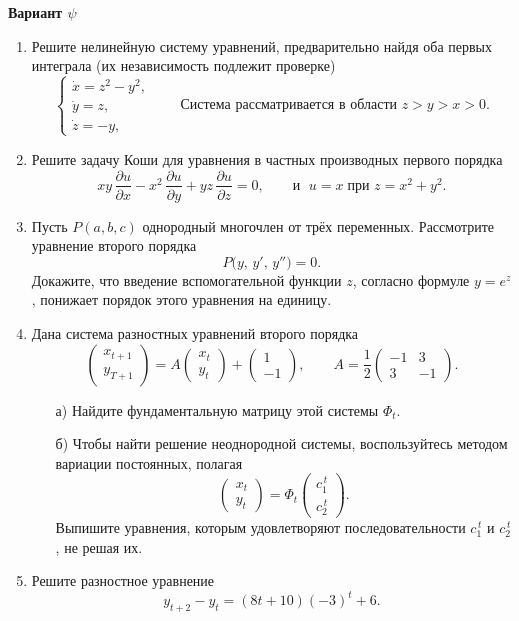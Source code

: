 \documentclass[12pt]{article}
\begin{document}
\begin{center}
\textbf{Вариант $\psi$}
\end{center}

\begin{enumerate}
\item Решите нелинейную систему уравнений, предварительно найдя оба первых интеграла (их независимость подлежит проверке)
\[
\begin{cases}
\dot x = z^{2}-y^{2},\\[2pt]
\dot y = z,\\[2pt]
\dot z = -y,
\end{cases}
\qquad
\text{Система рассматривается в области } z>y>x>0.
\]

\item Решите задачу Коши для уравнения в частных производных первого порядка
\[
xy\,\frac{\partial u}{\partial x}
- x^{2}\,\frac{\partial u}{\partial y}
+ yz\,\frac{\partial u}{\partial z}=0,
\qquad
\text{и } \; u = x \; \text{при } z = x^{2}+y^{2}.
\]

\item Пусть $P(a,b,c)$ однородный многочлен от трёх переменных. Рассмотрите уравнение второго порядка
\[
P\bigl(y,\,y',\,y''\bigr)=0.
\]
Докажите, что введение вспомогательной функции $z$, согласно формуле $y=e^{z}$, понижает порядок этого уравнения на единицу.

\item Дана система разностных уравнений второго порядка
\[
\begin{pmatrix}
x_{t+1}\\[2pt]
y_{T+1}
\end{pmatrix}
=
A
\begin{pmatrix}
x_{t}\\[2pt]
y_{t}
\end{pmatrix}
+
\begin{pmatrix}
1\\[2pt]
-1
\end{pmatrix},
\qquad
A=\frac12
\begin{pmatrix}
-1 & 3\\
3 & -1
\end{pmatrix}.
\]
\begin{enumerate}
\item[а)] Найдите фундаментальную матрицу этой системы $\Phi_t$.
\item[б)] Чтобы найти решение неоднородной системы, воспользуйтесь методом вариации постоянных, полагая
\[
\begin{pmatrix}
x_{t}\\[2pt]
y_{t}
\end{pmatrix}
=
\Phi_{t}
\begin{pmatrix}
c_{1}^{\,t}\\[2pt]
c_{2}^{\,t}
\end{pmatrix}.
\]
Выпишите уравнения, которым удовлетворяют последовательности $c_{1}^{\,t}$ и $c_{2}^{\,t}$, не решая их.
\end{enumerate}

\item Решите разностное уравнение
\[
y_{t+2}-y_{t}=(8t+10)(-3)^{t}+6.
\]
\end{enumerate}
\end{document}
